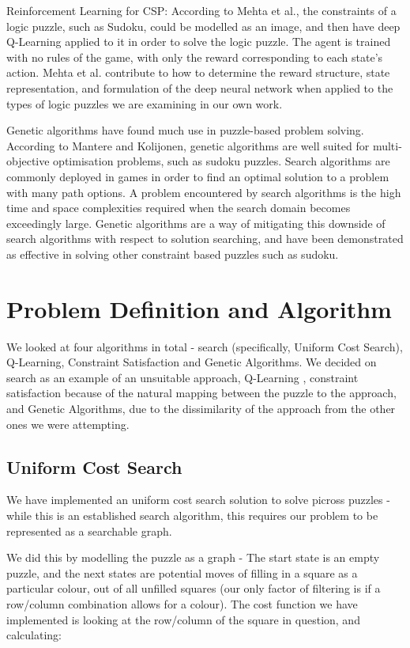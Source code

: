 \documentclass{svproc}
\begin{document}
Reinforcement Learning for CSP: According to Mehta et al.\cite{Qlearning}, the constraints of a logic puzzle, such as Sudoku, could be modelled as an image, and then have deep Q-Learning applied to it in order to solve the logic puzzle.
The agent is trained with no rules of the game, with only the reward corresponding to each state's action.
Mehta et al. contribute to how to determine the reward structure, state representation, and formulation of the deep neural network when applied to the types of logic puzzles we are examining in our own work.

Genetic algorithms have found much use in puzzle-based problem solving.
According to Mantere and Kolijonen\cite{geneticAlgo}, genetic algorithms are well suited for multi-objective optimisation problems, such as sudoku puzzles.
Search algorithms are commonly deployed in games in order to find an optimal solution to a problem with many path options.
A problem encountered by search algorithms is the high time and space complexities required when the search domain becomes exceedingly large.
Genetic algorithms are a way of mitigating this downside of search algorithms with respect to solution searching, and have been demonstrated as effective in solving other constraint based puzzles such as sudoku.

\section{Problem Definition and Algorithm}
We looked at four algorithms in total - search (specifically, Uniform Cost Search), Q-Learning, Constraint Satisfaction and Genetic Algorithms.
We decided on search as an example of an unsuitable approach, Q-Learning , constraint satisfaction because of the natural mapping between the puzzle to the approach, and Genetic Algorithms, due to the dissimilarity of the approach from the other ones we were attempting.

\subsection{Uniform Cost Search}
We have implemented an uniform cost search solution to solve picross puzzles - while this is an established search algorithm, this requires our problem to be represented as a searchable graph.

We did this by modelling the puzzle as a graph - The start state is an empty puzzle, and the next states are potential moves of filling in a square as a particular colour, out of all unfilled squares (our only factor of filtering is if a row/column combination allows for a colour).
The cost function we have implemented is looking at the row/column of the square in question, and calculating:
\end{document}
